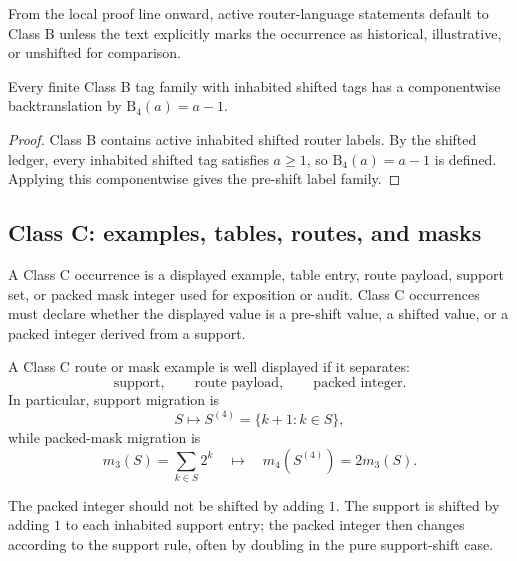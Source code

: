 \begin{remark}
\label{rem:v400-r02-class-b-default}
From the local proof line onward, active router-language statements default to Class B
unless the text explicitly marks the occurrence as historical, illustrative, or
unshifted for comparison.
\end{remark}

\begin{lemma}
\label{lem:v400-r02-class-b-backtranslation}
Every finite Class B tag family with inhabited shifted tags has a componentwise
backtranslation by $\mathrm B_4(a)=a-1$.
\end{lemma}

\begin{proof}
Class B contains active inhabited shifted router labels. By the shifted ledger, every
inhabited shifted tag satisfies $a\geq 1$, so $\mathrm B_4(a)=a-1$ is defined.
Applying this componentwise gives the pre-shift label family.
\end{proof}

\subsection{Class C: examples, tables, routes, and masks}
\label{subsec:v400-r02-class-c-examples-tables-routes-masks}

\begin{definition}
\label{def:v400-r02-class-c-occurrence}
A Class C occurrence is a displayed example, table entry, route payload, support
set, or packed mask integer used for exposition or audit. Class C occurrences
must declare whether the displayed value is a pre-shift value, a shifted value, or a
packed integer derived from a support.
\end{definition}

\begin{definition}
\label{def:v400-r02-class-c-display-contract}
A Class C route or mask example is well displayed if it separates:
\[
 \text{support},\qquad \text{route payload},\qquad \text{packed integer}.
\]
In particular, support migration is
\[
 S\mapsto S^{(4)}=\{k+1:k\in S\},
\]
while packed-mask migration is
\[
 m_3(S)=\sum_{k\in S}2^k
 \quad\mapsto\quad
 m_4(S^{(4)})=2m_3(S).
\]
\end{definition}

\begin{remark}
\label{rem:v400-r02-class-c-warning}
The packed integer should not be shifted by adding $1$. The support is shifted
by adding $1$ to each inhabited support entry; the packed integer then changes
according to the support rule, often by doubling in the pure support-shift
case.
\end{remark}

